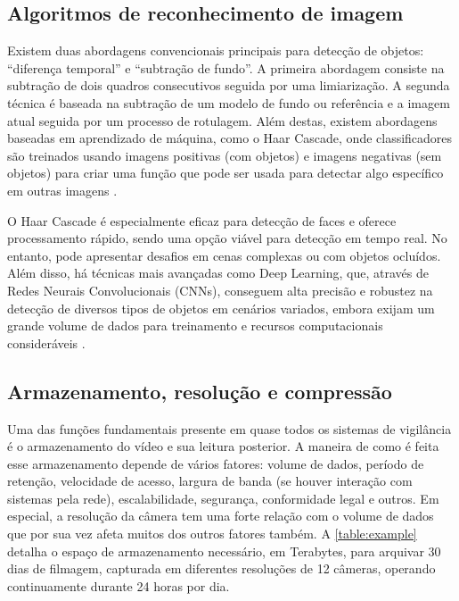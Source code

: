 \documentclass[12pt, %
openright, 
oneside, %
a4paper,    %
brazil]{facom-ufu-abntex2}
\begin{document}
\subsection{Algoritmos de reconhecimento de imagem}

Existem duas abordagens convencionais principais para detecção de objetos:
``diferença temporal'' e ``subtração de fundo''. A primeira abordagem consiste
na subtração de dois quadros consecutivos seguida por uma limiarização. A
segunda técnica é baseada na subtração de um modelo de fundo ou referência e a
imagem atual seguida por um processo de rotulagem. Além destas, existem
abordagens baseadas em aprendizado de máquina, como o Haar Cascade, onde
classificadores são treinados usando imagens positivas (com objetos) e imagens
negativas (sem objetos) para criar uma função que pode ser usada para detectar
algo específico em outras imagens \cite{Valera2005IntelligentDS31}.

O Haar Cascade é especialmente eficaz para detecção de faces e oferece
processamento rápido, sendo uma opção viável para detecção em tempo real. No
entanto, pode apresentar desafios em cenas complexas ou com objetos ocluídos.
Além disso, há técnicas mais avançadas como Deep Learning, que, através de
Redes Neurais Convolucionais (CNNs), conseguem alta precisão e robustez na
detecção de diversos tipos de objetos em cenários variados, embora exijam um
grande volume de dados para treinamento e recursos computacionais consideráveis
\cite{MLKHaarCascade2021}.

\subsection{Armazenamento, resolução e compressão}

Uma das funções fundamentais presente em quase todos os sistemas de vigilância
é o armazenamento do vídeo e sua leitura posterior. A maneira de como é feita
esse armazenamento depende de vários fatores: volume de dados, período de
retenção, velocidade de acesso, largura de banda (se houver interação com
sistemas pela rede), escalabilidade, segurança, conformidade legal e outros. Em
especial, a resolução da câmera tem uma forte relação com o volume de dados que
por sua vez afeta muitos dos outros fatores também. A \autoref{table:example}
detalha o espaço de armazenamento necessário, em Terabytes, para arquivar 30
dias de filmagem, capturada em diferentes resoluções de 12 câmeras, operando
continuamente durante 24 horas por dia.  %
\end{document}
